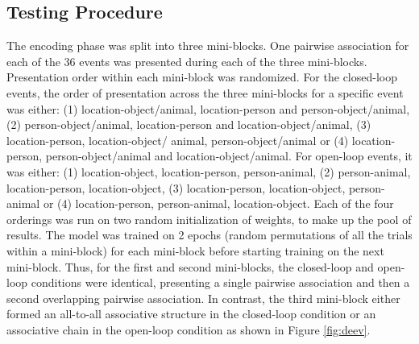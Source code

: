 \documentclass[11pt, titlepage, twoside]{article}
\begin{document}
\subsection{Testing Procedure}
\label{sec:TestProc}
The encoding phase was split into three mini-blocks. One pairwise association for each of the 36 events was presented during each of the three mini-blocks. Presentation order within each mini-block was randomized. For the closed-loop events, the order of presentation across the three mini-blocks for a specific event was either: (1) location-object/animal, location-person and person-object/animal, (2) person-object/animal, location-person and location-object/animal, (3) location-person, location-object/ animal, person-object/animal or (4) location-person, person-object/animal and location-object/animal. For open-loop events, it was either: (1) location-object, location-person, person-animal, (2) person-animal, location-person, location-object, (3) location-person, location-object, person-animal or (4) location-person, person-animal, location-object. Each of the four orderings was run on two random initialization of weights, to make up the pool of results. The model was trained on 2 epochs (random permutations of all the trials within a mini-block) for each mini-block before starting training on the next mini-block.  Thus, for the first and second mini-blocks, the closed-loop and open-loop conditions were identical, presenting a single pairwise association and then a second overlapping pairwise association. In contrast, the third mini-block either formed an all-to-all associative structure in the closed-loop condition or an associative chain in the open-loop condition as shown in Figure \ref{fig:deev}.
\end{document}
